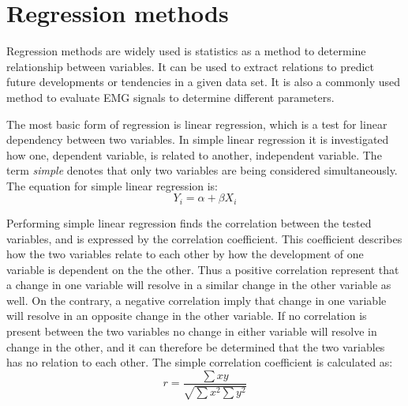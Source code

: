 \section{Regression methods}

	

Regression methods are widely used is statistics as a method to determine relationship between variables. It can be used to extract relations to predict future developments or tendencies in a given data set. It is also a commonly used method to evaluate EMG signals to determine different parameters. 

The most basic form of regression is linear regression, which is a test for linear dependency between two variables. In simple linear regression it is investigated how one, dependent variable, is related to another, independent variable. The term \textit{simple} denotes that only two variables are being considered simultaneously. The equation for simple linear regression is: \cite{zar2009}
\begin{equation}
Y_i = \alpha + \beta X_i
\end{equation}

Performing simple linear regression finds the correlation between the tested variables, and is expressed by the correlation coefficient. This coefficient describes how the two variables relate to each other by how the development of one variable is dependent on the the other. Thus a positive correlation represent that a change in one variable will resolve in a similar change in the other variable as well. On the contrary, a negative correlation imply that change in one variable will resolve in an opposite change in the other variable. If no correlation is present between the two variables no change in either variable will resolve in change in the other, and it can therefore be determined that the two variables has no relation to each other. \cite{zar2009}
The simple correlation coefficient is calculated as: \cite{zar2009}
\begin{equation}
r = \frac{\sum xy}{\sqrt{\sum x^{2} \sum y^{2}}}
\end{equation}

